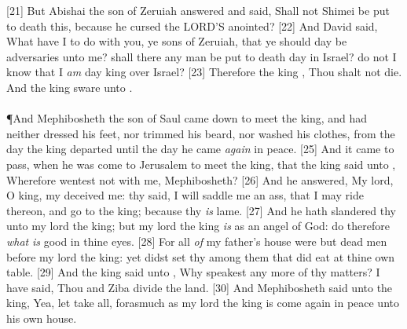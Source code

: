 [21] \textcolor[cmyk]{0.99998,1,0,0}{But Abishai the son of Zeruiah answered and said, Shall not Shimei be put to death  this, because he cursed the LORD'S anointed?}
[22] \textcolor[cmyk]{0.99998,1,0,0}{And David said, What have I to do with you, ye sons of Zeruiah, that ye should  day be adversaries unto me? shall there any man be put to death  day in Israel?  do not I know that I \emph{am}  day king over Israel?}
[23] \textcolor[cmyk]{0.99998,1,0,0}{Therefore the king , Thou shalt not die. And the king sware unto .}\\
\\
\P \textcolor[cmyk]{0.99998,1,0,0}{And Mephibosheth the son of Saul came down to meet the king, and had neither dressed his feet, nor trimmed his beard, nor washed his clothes, from the day the king departed until the day he came \emph{again} in peace.}
[25] \textcolor[cmyk]{0.99998,1,0,0}{And it came to pass, when he was come to Jerusalem to meet the king, that the king said unto , Wherefore wentest not  with me, Mephibosheth?}
[26] \textcolor[cmyk]{0.99998,1,0,0}{And he answered, My lord, O king, my  deceived me:  thy  said, I will saddle me an ass, that I may ride thereon, and go to the king; because thy  \emph{is} lame.}
[27] \textcolor[cmyk]{0.99998,1,0,0}{And he hath slandered thy  unto my lord the king; but my lord the king \emph{is} as an angel of God: do therefore \emph{what} \emph{is} good in thine eyes.}
[28] \textcolor[cmyk]{0.99998,1,0,0}{For all \emph{of} my father's house were but dead men before my lord the king: yet didst  set thy  among them that did eat at thine own table.  }
[29] \textcolor[cmyk]{0.99998,1,0,0}{And the king said unto , Why speakest  any more of thy matters? I have said, Thou and Ziba divide the land.}
[30] \textcolor[cmyk]{0.99998,1,0,0}{And Mephibosheth said unto the king, Yea, let  take all, forasmuch as my lord the king is come again in peace unto his own house.}\\
